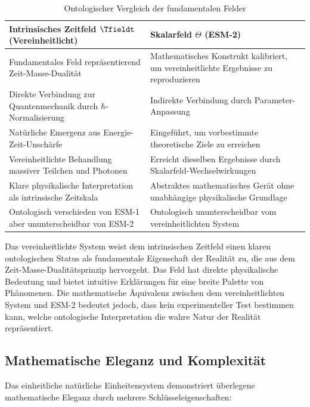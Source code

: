 	\begin{table}[ht]
		\centering
		\caption{Ontologischer Vergleich der fundamentalen Felder}
		\label{tab:ontological_comparison}
		\begin{tabular}{p{}|p{}}
			\hline
			\textbf{Intrinsisches Zeitfeld $\Tfieldt$ (Vereinheitlicht)} & \textbf{Skalarfeld $\Theta$ (ESM-2)} \\
			\hline
			Fundamentales Feld repräsentierend Zeit-Masse-Dualität & Mathematisches Konstrukt kalibriert, um vereinheitlichte Ergebnisse zu reproduzieren \\
			\hline
			Direkte Verbindung zur Quantenmechanik durch $\hbar$-Normalisierung & Indirekte Verbindung durch Parameter-Anpassung \\
			\hline
			Natürliche Emergenz aus Energie-Zeit-Unschärfe & Eingeführt, um vorbestimmte theoretische Ziele zu erreichen \\
			\hline
			Vereinheitlichte Behandlung massiver Teilchen und Photonen & Erreicht dieselben Ergebnisse durch Skalarfeld-Wechselwirkungen \\
			\hline
			Klare physikalische Interpretation als intrinsische Zeitskala & Abstraktes mathematisches Gerät ohne unabhängige physikalische Grundlage \\
			\hline
			Ontologisch verschieden von ESM-1 aber ununterscheidbar von ESM-2 & Ontologisch ununterscheidbar vom vereinheitlichten System \\
			\hline
		\end{tabular}
	\end{table}
	
	Das vereinheitlichte System weist dem intrinsischen Zeitfeld einen klaren ontologischen Status als fundamentale Eigenschaft der Realität zu, die aus dem Zeit-Masse-Dualitätsprinzip hervorgeht. Das Feld hat direkte physikalische Bedeutung und bietet intuitive Erklärungen für eine breite Palette von Phänomenen. Die mathematische Äquivalenz zwischen dem vereinheitlichten System und ESM-2 bedeutet jedoch, dass kein experimenteller Test bestimmen kann, welche ontologische Interpretation die wahre Natur der Realität repräsentiert.
	
	\subsection{Mathematische Eleganz und Komplexität}
	\label{subsec:mathematical_elegance}
	
	Das einheitliche natürliche Einheitensystem demonstriert überlegene mathematische Eleganz durch mehrere Schlüsseleigenschaften:
	
